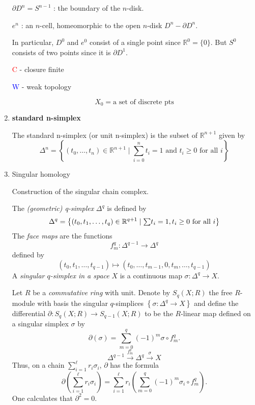 \documentclass{ctexart}
\begin{document}
\begin{enumerate}
$\partial D^n = S^{n-1}$ : the boundary of the $n$-disk.

$e^n$ : an $n$-cell, homeomorphic to the open $n$-disk $D^n - {\partial D^n}$.

In particular, $D^0$ and $e^0$ consist of a single point since $\mathbb{R}^0 = \{0\}$. But $S^0$ consists of two points since it is $\partial D^1$.

\textcolor{red}{C} - closure finite

\textcolor{blue}{W} - weak topology

\[
X_0 = \text{a set of discrete pts}
\]

\begin{center}
\end{center}

\item \textbf{standard n-simplex}

The standard n-simplex (or unit n-simplex) is the subset of $\mathbb{R}^{n+1}$ given by
\[
\Delta^n = \left\{(t_0,\ldots,t_n)\in \mathbb{R}^{n+1}\mid \sum_{i=0}^{n} t_i = 1 \text{ and } t_i \geq 0 \text{ for all } i\right\}
\]

\item Singular homology\cite[p.1]{kirklecture}\cite{singular_homology}

Construction of the singular chain complex.

The \textit{(geometric) q-simplex} $\Delta^q$ is defined by
\[
\Delta^q = \left\{(t_0,t_1,\ldots,t_q)\in \mathbb{R}^{q+1}\mid \mathsmaller{\sum} t_i = 1, t_i \geq 0\text{ for all } i\right\}
\]
The \textit{face maps} are the functions
\[
f_m^q : \Delta^{q-1} \to \Delta^q
\]
defined by
\[
(t_0,t_1,\ldots,t_{q-1}) \mapsto (t_0,\ldots,t_{m-1},0,t_m,\ldots,t_{q-1})
\]
A \textit{singular $q$-simplex in a space} $X$ is a continuous map $\sigma : \Delta^{q} \to X$.

Let $R$ be a \textit{commutative ring} with unit. Denote by $S_q(X;R)$ the free $R$-module with basis the singular $q$-simplices $\left\{\sigma : \Delta^q \to X\right\}$ and define the differential $\partial : S_q(X;R)\to S_{q-1}(X;R)$ to be the $R$-linear map defined on a singular simplex $\sigma$ by
\[
\partial(\sigma) = \sum_{m=0}^{q} (-1)^m\sigma\circ f_m^q.
\]
\[
\Delta^{q-1} \overset{f_m^q}{\to} \Delta^q \overset{\sigma}{\to} X
\]
Thus, on a chain $\sum_{i=1}^{\ell}r_i\sigma_i$, $\partial$ has the formula
\[
\partial\left(\sum_{i=1}^{\ell}r_i\sigma_i\right) = \sum_{i=1}^{\ell}r_i\left(\sum_{m=0}^{q}\left(-1\right)^m \sigma_i \circ f_m^q \right).
\]
One calculates that $\partial^2 = 0$.


\end{enumerate}
\end{document}
